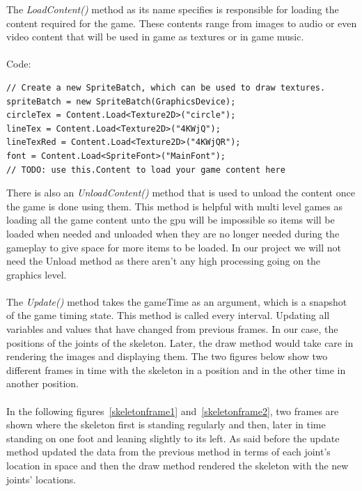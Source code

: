 The \emph{LoadContent()} method as its name specifies is responsible for loading the content required for the game. These contents range from images to audio or even video content that will be used in game as textures or in game music.
\\
\\
Code:
\begin{verbatim}
// Create a new SpriteBatch, which can be used to draw textures.
spriteBatch = new SpriteBatch(GraphicsDevice);
circleTex = Content.Load<Texture2D>("circle");
lineTex = Content.Load<Texture2D>("4KWjQ");
lineTexRed = Content.Load<Texture2D>("4KWjQR");
font = Content.Load<SpriteFont>("MainFont");
// TODO: use this.Content to load your game content here
\end{verbatim}
There is also an \emph{UnloadContent()} method that is used to unload the content once the game is done using them. This method is helpful with multi level games as loading all the game content unto the gpu will be impossible so items will be loaded when needed and unloaded when they are no longer needed during the gameplay to give space for more items to be loaded. In our project we will not need the Unload method as there aren't any high processing going on the graphics level.
\\
\\
The \emph{Update()} method takes the gameTime as an argument, which is a snapshot of the game timing state. This method is called every interval. Updating all variables and values that have changed from previous frames. In our case, the positions of the joints of the skeleton. Later, the draw method would take care in rendering the images and displaying them. The two figures below show two different frames in time with the skeleton in a position and in the other time in another position.
\\
\\
In the following figures~\ref{skeletonframe1} and~\ref{skeletonframe2}, two frames are shown where the skeleton first is standing regularly and then, later in time standing on one foot and leaning slightly to its left. As said before the update method updated the data from the previous method in terms of each joint's location in space and then the draw method rendered the skeleton with the new joints' locations.

